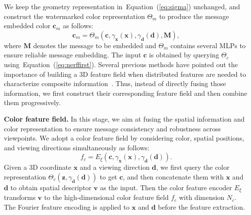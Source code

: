 \documentclass[10pt,twocolumn,letterpaper]{article}
\newcommand{\Eref}[1]{Equation~(\ref{#1})}
\begin{document}
We keep the geometry representation in~\Eref{eq:sigma} unchanged, and construct the watermarked color representation $\Theta_{m}$ to produce the message embedded color $\mathbf{c}_m$ as follows:
\begin{equation}
\mathbf{c}_m=\Theta_{m}\left(\mathbf{c},\gamma_{\mathbf{x}}(\mathbf{x}), \gamma_{\mathbf{d}}(\mathbf{d}), \mathbf{M}\right),
\end{equation}
where $\mathbf{M}$ denotes the message to be embedded and $\Theta_{m}$ contains several MLPs to ensure reliable message embedding. The input $\mathbf{c}$ is obtained by querying $\Theta_{c}$ using~\Eref{eq:nerffirst}. Several previous methods have pointed out the importance of building a 3D feature field when distributed features are needed to characterize 
composite information~\cite{xu20223d,chan2022efficient}. Thus, instead of directly fusing those information, we first construct their corresponding feature field and then combine them progressively.

\noindent\textbf{Color feature field.} In this stage, we aim at fusing the spatial information and color representation to ensure message consistency and robustness across viewpoints.  We adopt a color feature field by considering color, spatial positions, and viewing directions simultaneously as follows:
\begin{equation}
f_c=E_\xi(\mathbf{c},\gamma_{\mathbf{x}}(\mathbf{x}),\gamma_{\mathbf{d}}(\mathbf{d})).
\label{eq:colorrepresentation}
\end{equation}
%
Given a 3D coordinate $\mathbf{x}$ and a viewing direction $\mathbf{d}$, we first query the color representation $\Theta_{c}\left(\mathbf{z}, \gamma_{\mathbf{d}}(\mathbf{d})\right)$ to get $\mathbf{c}$, and then concatenate them with $\mathbf{x}$ and $\mathbf{d}$ to obtain spatial descriptor $\mathbf{v}$ as the input. Then the color feature encoder $E_{\xi}$ transforms $\mathbf{v}$ to the high-dimensional color feature field $f_c$ with dimension $N_c$. The Fourier feature encoding is applied to $\mathbf{x}$ and $\mathbf{d}$ before the feature extraction.
\end{document}
